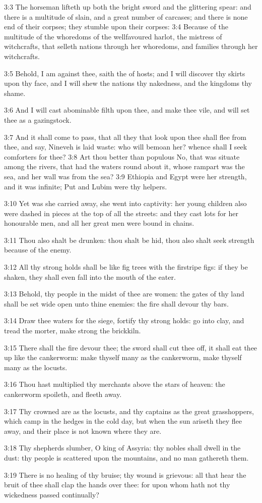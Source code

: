 3:3 The horseman lifteth up both the bright sword and the glittering
spear: and there is a multitude of slain, and a great number of
carcases; and there is none end of their corpses; they stumble upon
their corpses: 3:4 Because of the multitude of the whoredoms of the
wellfavoured harlot, the mistress of witchcrafts, that selleth nations
through her whoredoms, and families through her witchcrafts.

3:5 Behold, I am against thee, saith the \LORD of hosts; and I will
discover thy skirts upon thy face, and I will shew the nations thy
nakedness, and the kingdoms thy shame.

3:6 And I will cast abominable filth upon thee, and make thee vile,
and will set thee as a gazingstock.

3:7 And it shall come to pass, that all they that look upon thee shall
flee from thee, and say, Nineveh is laid waste: who will bemoan her?
whence shall I seek comforters for thee?  3:8 Art thou better than
populous No, that was situate among the rivers, that had the waters
round about it, whose rampart was the sea, and her wall was from the
sea?  3:9 Ethiopia and Egypt were her strength, and it was infinite;
Put and Lubim were thy helpers.

3:10 Yet was she carried away, she went into captivity: her young
children also were dashed in pieces at the top of all the streets: and
they cast lots for her honourable men, and all her great men were
bound in chains.

3:11 Thou also shalt be drunken: thou shalt be hid, thou also shalt
seek strength because of the enemy.

3:12 All thy strong holds shall be like fig trees with the firstripe
figs: if they be shaken, they shall even fall into the mouth of the
eater.

3:13 Behold, thy people in the midst of thee are women: the gates of
thy land shall be set wide open unto thine enemies: the fire shall
devour thy bars.

3:14 Draw thee waters for the siege, fortify thy strong holds: go into
clay, and tread the morter, make strong the brickkiln.

3:15 There shall the fire devour thee; the sword shall cut thee off,
it shall eat thee up like the cankerworm: make thyself many as the
cankerworm, make thyself many as the locusts.

3:16 Thou hast multiplied thy merchants above the stars of heaven: the
cankerworm spoileth, and fleeth away.

3:17 Thy crowned are as the locusts, and thy captains as the great
grasshoppers, which camp in the hedges in the cold day, but when the
sun ariseth they flee away, and their place is not known where they
are.

3:18 Thy shepherds slumber, O king of Assyria: thy nobles shall dwell
in the dust: thy people is scattered upon the mountains, and no man
gathereth them.

3:19 There is no healing of thy bruise; thy wound is grievous: all
that hear the bruit of thee shall clap the hands over thee: for upon
whom hath not thy wickedness passed continually?

